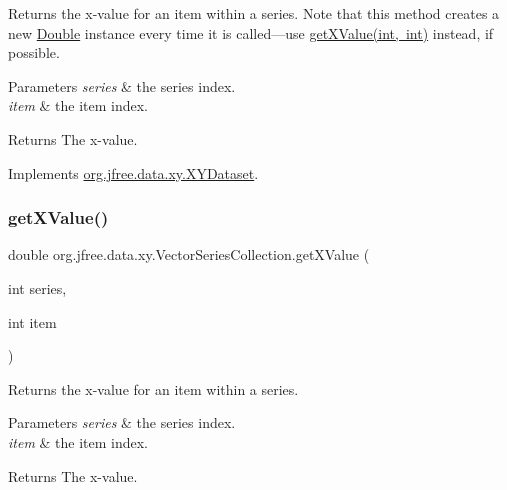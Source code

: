 Returns the x-\/value for an item within a series. Note that this method creates a new \mbox{\hyperlink{}{Double}} instance every time it is called---use \mbox{\hyperlink{classorg_1_1jfree_1_1data_1_1xy_1_1_vector_series_collection_a94c0b22e67110c43fb565a756b1c89e9}{get\+X\+Value(int, int)}} instead, if possible.


\begin{DoxyParams}{Parameters}
{\em series} & the series index. \\
\hline
{\em item} & the item index.\\
\hline
\end{DoxyParams}
\begin{DoxyReturn}{Returns}
The x-\/value. 
\end{DoxyReturn}


Implements \mbox{\hyperlink{interfaceorg_1_1jfree_1_1data_1_1xy_1_1_x_y_dataset_a85c75ba5b69b551e96afd29d1732ba22}{org.\+jfree.\+data.\+xy.\+X\+Y\+Dataset}}.

\mbox{\label{classorg_1_1jfree_1_1data_1_1xy_1_1_vector_series_collection_a94c0b22e67110c43fb565a756b1c89e9}} 
\subsubsection{\texorpdfstring{get\+X\+Value()}{getXValue()}}
{\footnotesize\ttfamily double org.\+jfree.\+data.\+xy.\+Vector\+Series\+Collection.\+get\+X\+Value (\begin{DoxyParamCaption}\item[{int}]{series,  }\item[{int}]{item }\end{DoxyParamCaption})}

Returns the x-\/value for an item within a series.


\begin{DoxyParams}{Parameters}
{\em series} & the series index. \\
\hline
{\em item} & the item index.\\
\hline
\end{DoxyParams}
\begin{DoxyReturn}{Returns}
The x-\/value. 
\end{DoxyReturn}


